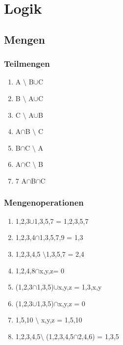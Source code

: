 \chapter{Logik}

\section{Mengen}
\subsection{Teilmengen}
 
\begin{enumerate}[label = {\arabic* =}]
    \item A $\setminus$ B$\cup$C
    \item B $\setminus$ A$\cup$C
    \item C $\setminus$ A$\cup$B
    \item A$\cap$B $\setminus$ C
    \item B$\cap$C $\setminus$ A
    \item A$\cap$C $\setminus$ B
    \item 7 A$\cap$B$\cap$C
\end{enumerate}
\subsection{Mengenoperationen}
\begin{enumerate}
    \item {1,2,3}$\cup${1,3,5,7} = {1,2,3,5,7}
    \item {1,2,3,4}$\cap${1,3,5,7,9} = {1,3}
    \item {1,2,3,4,5} $\setminus${1,3,5,7} = {2,4}
    \item {1,2,4,8}$\cap${x,y,z}= 0
    \item ({1,2,3}$\cap${1,3,5})$\cup${x,y,z} = {1,3,x,y}
    \item ({1,2,3}$\cup${1,3,5})$\cap${x,y,z} = 0
    \item {1,5,10} $\setminus$ {x,y,z} = {1,5,10}
    \item {1,2,3,4,5}$\setminus$ ({1,2,3,4,5}$\cap${2,4,6}) = {1,3,5}
\end{enumerate}
